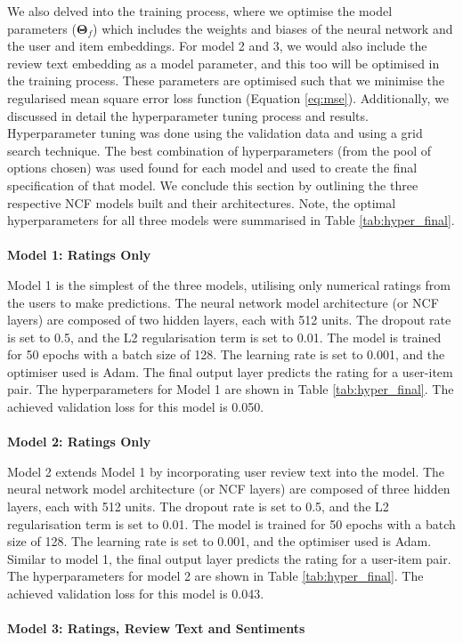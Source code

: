 We also delved into the training process, where we optimise the model parameters ($\boldsymbol{\Theta}_f$) which includes the weights and biases of the neural network and the user and item embeddings. For model 2 and 3, we would also include the review text embedding as a model parameter, and this too will be optimised in the training process. These parameters are optimised such that we minimise the regularised mean square error loss function (Equation \ref{eq:mse}). Additionally, we discussed in detail the hyperparameter tuning process and results. Hyperparameter tuning was done using the validation data and using a grid search technique. The best combination of hyperparameters (from the pool of options chosen) was used found for each model and used to create the final specification of that model. We conclude this section by outlining the three respective NCF models built and their architectures. Note, the optimal hyperparameters for all three models were summarised in Table \ref{tab:hyper_final}.
\\
\\
\textbf{Model 1: Ratings Only}

Model 1 is the simplest of the three models, utilising only numerical ratings from the users  to make predictions. The neural network model architecture (or NCF layers) are composed of two hidden layers, each with 512 units. The dropout rate is set to 0.5, and the L2 regularisation term is set to 0.01. The model is trained for 50 epochs with a batch size of 128. The learning rate is set to 0.001, and the optimiser used is Adam. The final output layer predicts the rating for a user-item pair. The hyperparameters for Model 1 are shown in Table \ref{tab:hyper_final}. The achieved validation loss for this model is 0.050.
\\
\\
\textbf{Model 2: Ratings Only}

Model 2 extends Model 1 by incorporating user review text into the model. The neural network model architecture (or NCF layers) are composed of three hidden layers, each with 512 units. The dropout rate is set to 0.5, and the L2 regularisation term is set to 0.01. The model is trained for 50 epochs with a batch size of 128. The learning rate is set to 0.001, and the optimiser used is Adam. Similar to model 1, the final output layer predicts the rating for a user-item pair. The hyperparameters for model 2 are shown in Table \ref{tab:hyper_final}. The achieved validation loss for this model is 0.043. 
\\
\\
\textbf{Model 3: Ratings, Review Text and Sentiments}

